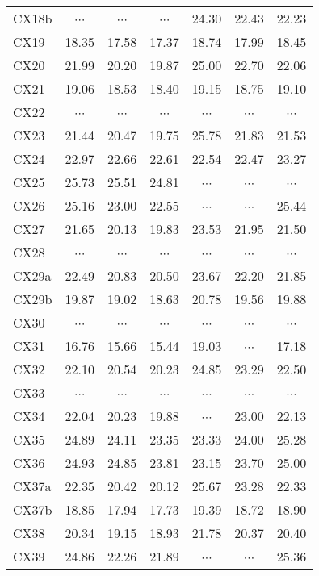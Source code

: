 \documentclass[fleqn,usenatbib]{mnras}
\newcommand\nodata{ ~$\cdots$~ }%
\newcommand{\nd}{\nodata}
\begin{document}
\begin{table}
\begin{tabular}{lcccccc}
CX18b  &  \nd    &  \nd    &  \nd    &  24.30  &  22.43  &  22.23  \\
CX19   &  18.35  &  17.58  &  17.37  &  18.74  &  17.99  &  18.45  \\
CX20   &  21.99  &  20.20  &  19.87  &  25.00  &  22.70  &  22.06  \\
CX21   &  19.06  &  18.53  &  18.40  &  19.15  &  18.75  &  19.10  \\
CX22   &  \nd    &  \nd    &  \nd    &  \nd    &  \nd    &  \nd    \\
CX23   &  21.44  &  20.47  &  19.75  &  25.78  &  21.83  &  21.53  \\
CX24   &  22.97  &  22.66  &  22.61  &  22.54  &  22.47  &  23.27  \\
CX25   &  25.73  &  25.51  &  24.81  &  \nd    &  \nd    &  \nd    \\
CX26   &  25.16  &  23.00  &  22.55  &  \nd    &  \nd    &  25.44  \\
CX27   &  21.65  &  20.13  &  19.83  &  23.53  &  21.95  &  21.50  \\
CX28   &  \nd    &  \nd    &  \nd    &  \nd    &  \nd    &  \nd    \\
CX29a  &  22.49  &  20.83  &  20.50  &  23.67  &  22.20  &  21.85  \\
CX29b  &  19.87  &  19.02  &  18.63  &  20.78  &  19.56  &  19.88  \\
CX30   &  \nd    &  \nd    &  \nd    &  \nd    &  \nd    &  \nd    \\
CX31   &  16.76  &  15.66  &  15.44  &  19.03  &  \nd    &  17.18  \\
CX32   &  22.10  &  20.54  &  20.23  &  24.85  &  23.29  &  22.50  \\
CX33   &  \nd    &  \nd    &  \nd    &  \nd    &  \nd    &  \nd    \\
CX34   &  22.04  &  20.23  &  19.88  &  \nd    &  23.00  &  22.13  \\
CX35   &  24.89  &  24.11  &  23.35  &  23.33  &  24.00  &  25.28  \\
CX36   &  24.93  &  24.85  &  23.81  &  23.15  &  23.70  &  25.00  \\
CX37a  &  22.35  &  20.42  &  20.12  &  25.67  &  23.28  &  22.33  \\
CX37b  &  18.85  &  17.94  &  17.73  &  19.39  &  18.72  &  18.90  \\
CX38   &  20.34  &  19.15  &  18.93  &  21.78  &  20.37  &  20.40  \\
CX39   &  24.86  &  22.26  &  21.89  &  \nd    &  \nd    &  25.36  \\

\end{tabular}
\end{table}
\end{document}
